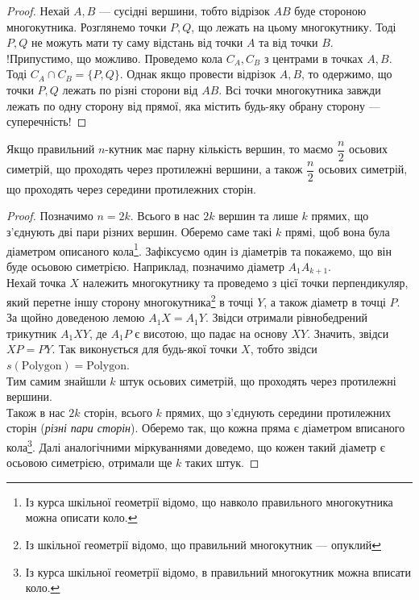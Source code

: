 \documentclass{math_library}
\begin{document}
\begin{proof}
Нехай $A,B$ --- сусідні вершини, тобто відрізок $AB$ буде стороною многокутника. Розглянемо точки $P,Q$, що лежать на цьому многокутнику. Тоді $P,Q$ не можуть мати ту саму відстань від точки $A$ та від точки $B$.\\
!Припустимо, що можливо. Проведемо кола $C_A,C_B$ з центрами в точках $A,B$. Тоді $C_A \cap C_B = \{P,Q\}$. Однак якщо провести відрізок $A,B$, то одержимо, що точки $P,Q$ лежать по різні сторони від $AB$. Всі точки многокутника завжди лежать по одну сторону від прямої, яка містить будь-яку обрану сторону --- суперечність!
\end{proof}

\begin{lemma}
Якщо правильний $n$-кутник має парну кількість вершин, то маємо $\dfrac{n}{2}$ осьових симетрій, що проходять через протилежні вершини, а також $\dfrac{n}{2}$ осьових симетрій, що проходять через середини протилежних сторін.
\end{lemma}

\begin{proof}
Позначимо $n = 2k$. Всього в нас $2k$ вершин та лише $k$ прямих, що з'єднують дві пари різних вершин. Оберемо саме такі $k$ прямі, щоб вона була діаметром описаного кола\footnote{Із курса шкільної геометрії відомо, що навколо правильного многокутника можна описати коло.}. Зафіксуємо один із діаметрів та покажемо, що він буде осьовою симетрією. Наприклад, позначимо діаметр $A_1A_{k+1}$. \\
Нехай точка $X$ належить многокутнику та проведемо з цієї точки перпендикуляр, який перетне іншу сторону многокутника\footnote{Із шкільної геометрії відомо, що правильний многокутник --- опуклий} в точці $Y$, а також діаметр в точці $P$. За щойно доведеною лемою $A_1X = A_1Y$. Звідси отримали рівнобедрений трикутник $A_1XY$, де $A_1P$ є висотою, що падає на основу $XY$. Значить, звідси $XP = PY$. Так виконується для будь-якої точки $X$, тобто звідси $s(\text{Polygon}) = \text{Polygon}$.\\
Тим самим знайшли $k$ штук осьових симетрій, що проходять через протилежні вершини.
\bigskip \\
Також в нас $2k$ сторін, всього $k$ прямих, що з'єднують середини протилежних сторін (\textit{різні пари сторін}). Оберемо так, що кожна пряма є діаметром вписаного кола\footnote{Із курса шкільної геометрії відомо, в правильний многокутник можна вписати коло.}. Далі аналогічними міркуваннями доведемо, що кожен такий діаметр є осьовою симетрією, отримали ще $k$ таких штук.
\end{proof}
\end{document}
